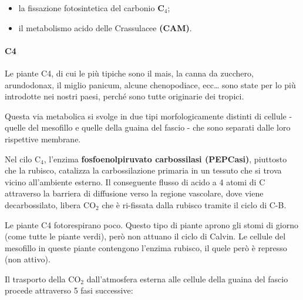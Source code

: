 \documentclass[]{article}
\begin{document}
\begin{itemize}
\itemsep1pt\parskip0pt
\item
  la fissazione fotosintetica del carbonio \textbf{C$_4$};
\item
  il metabolismo acido delle Crassulacee \textbf{(CAM)}.
\end{itemize}

\paragraph{C4}\label{c4}

Le piante C4, di cui le più tipiche sono il mais, la canna da zucchero,
arundodonax, il miglio panicum, alcune chenopodiace, ecc\ldots{} sono
state per lo più introdotte nei nostri paesi, perché sono tutte
originarie dei tropici.

Questa via metabolica si svolge in due tipi morfologicamente distinti di
cellule - quelle del mesofillo e quelle della guaina del fascio - che
sono separati dalle loro rispettive membrane.

Nel cilo C$_4$, l'enzima \textbf{fosfoenolpiruvato carbossilasi
(PEPCasi)}, piuttosto che la rubisco, catalizza la carbossilazione
primaria in un tessuto che si trova vicino all'ambiente esterno. Il
conseguente flusso di acido a 4 atomi di C attraverso la barriera di
diffusione verso la regione vascolare, dove viene decarbossilato, libera
CO$_2$ che è ri-fissata dalla rubisco tramite il ciclo di C-B.

Le piante C4 fotorespirano poco. Questo tipo di piante aprono gli stomi
di giorno (come tutte le piante verdi), però non attuano il ciclo di
Calvin. Le cellule del mesofillo in queste piante contengono l'enzima
rubisco, il quele però è represso (non attivo).

Il trasporto della CO$_2$ dall'atmosfera esterna alle cellule della
guaina del fascio procede attraverso 5 fasi successive:
\end{document}
